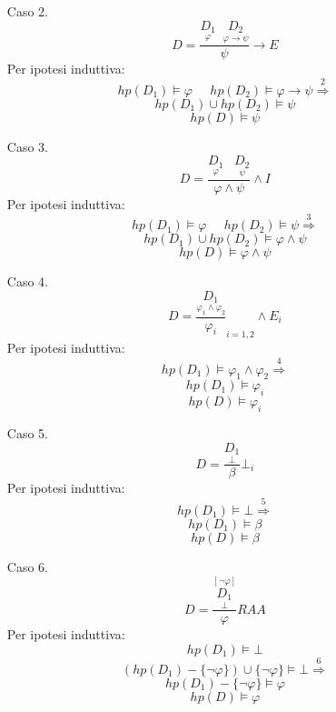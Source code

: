 \documentclass{article}
\theoremstyle{break}
\theoremstyle{break}
\theoremstyle{break}
\theoremstyle{break}
\begin{document}
\begin{enumerate}
\begin{enumerate}
\begin{enumerate}
            \end{enumerate}
            \item [Caso 2.]
                \[
                    D= \frac{\underset{\varphi}{D_1}\;\; \underset{\varphi \to \psi}{D_2}}{\psi} \to E
                \] 
                Per ipotesi induttiva:
                \[
                hp(D_1) \models \varphi\;\;\;\;\; hp(D_2) \models \varphi \to \psi \stackrel{2}{\Rightarrow}
                \] 
                \[
                hp(D_1) \cup hp(D_2) \models \psi
                \] 
                \[
                hp(D) \models \psi
                \] 
              \item [Caso 3.] 
                \[
                  D=\frac{\underset{\varphi}{D_1}\;\;\;\underset{\psi}{D_2}}{\varphi \wedge \psi} \wedge I
                \] 
                Per ipotesi induttiva:
                \[
                hp(D_1) \models \varphi\;\;\;\;\; hp(D_2) \models \psi \stackrel{3}{\Rightarrow}
                \] 
                \[
                hp(D_1) \cup hp(D_2) \models \varphi \wedge \psi
                \] 
                \[
                hp(D) \models \varphi \wedge \psi
                \] 
              \item [Caso 4.] 
                \[
                  D=\frac{\underset{\varphi_1 \wedge \varphi_2}{D_1}}{\varphi_i}_{i=1,2} \wedge E_i
                \] 
                Per ipotesi induttiva:
                \[
                hp(D_1) \models \varphi_1 \wedge \varphi_2 \stackrel{4}{\Rightarrow}
                \]  
                \[
                hp(D_1) \models \varphi_i
                \] 
                \[
                hp(D) \models \varphi_i
                \] 
              \item [Caso 5.]
                \[
                  D=\frac{\underset{\bot}{D_1}}{\beta}\bot_i
                \] 
                Per ipotesi induttiva:
                \[
                  hp(D_1) \models \bot \stackrel{5}{\Rightarrow}
                \] 
                \[
                hp(D_1) \models \beta
                \] 
                \[
                  hp(D) \models \beta
                \] 
              \item [Caso 6.]
                \[
                  D= \frac{\underset{\bot}{\stackrel{[\neg \varphi]}{D_1}}}{\varphi} RAA
                \] 
                Per ipotesi induttiva:
                \[
                hp(D_1) \models \bot
                \] 
                \[
                  (hp(D_1)-\{\neg \varphi\}) \cup \{\neg \varphi\} \models \bot \stackrel{6}{\Rightarrow}
                \] 
                \[
                hp(D_1) - \{\neg \varphi\} \models \varphi 
                \] 
                \[
                hp(D) \models \varphi
                \] 
        \end{enumerate}
\end{enumerate}
\end{document}
